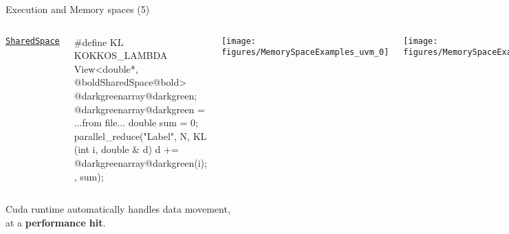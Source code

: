 \ifmedium
\begin{frame}[fragile]{Execution and Memory spaces (5)}

  \vspace{-30pt}

  \begin{columns}[t,onlytextwidth]

    \vspace{15pt}

    \ul{\texttt{SharedSpace}}

    \vspace{5pt}

    \begin{code}[keywords={}]
#define KL KOKKOS_LAMBDA
View<double*,
     @boldSharedSpace@bold> @darkgreenarray@darkgreen;
@darkgreenarray@darkgreen = ...from file...
double sum = 0;
parallel_reduce("Label", N,
  KL (int i, double & d) {
    d += @darkgreenarray@darkgreen(i);
  },
  sum);
    \end{code}

    \vspace{5pt}



      \begin{center}
        \texttt{[image: figures/MemorySpaceExamples\_uvm\_0]}
      \end{center}
      \begin{center}
        \texttt{[image: figures/MemorySpaceExamples\_uvm\_1]}
      \end{center}

  \end{columns}

  \vspace{10pt}

  Cuda runtime automatically handles data movement,
  \\ at a \textbf{performance hit}.

\end{frame}
\fi

